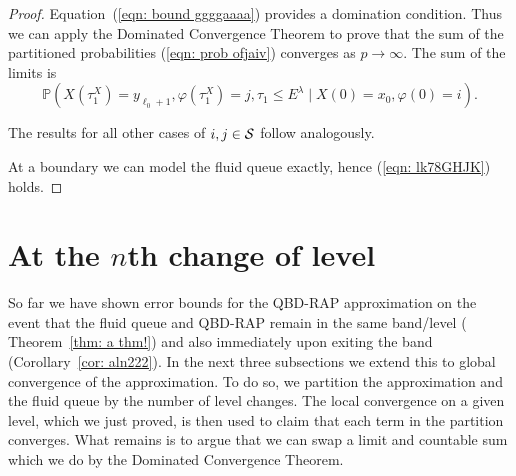 \begin{proof}
	
	Equation~(\ref{eqn: bound ggggaaaa}) provides a domination condition. Thus we can apply the Dominated Convergence Theorem to prove that the sum of the partitioned probabilities (\ref{eqn: prob ofjaiv}) converges as \(p\to\infty\). The sum of the limits is 
	\[\mathbb P(X(\tau_1^X) = y_{\ell_0+1}, \varphi(\tau_1^X) = j, \tau_{1}\leq E^\lambda 
            	 \mid X(0) = x_0, \varphi(0) = i).\]
	 
	 The results for all other cases of \(i,j\in\mathcal{S}\) follow analogously.
	
	At a boundary we can model the fluid queue exactly, hence (\ref{eqn: lk78GHJK}) holds.
\end{proof}


\section{At the \(n\)th change of level}\label{sec: nth change}

So far we have shown error bounds for the QBD-RAP approximation on the event that the fluid queue and QBD-RAP remain in the same band/level (%
Theorem~\ref{thm: a thm!}) and also immediately upon exiting the band (Corollary~\ref{cor: aln222}). In the next three subsections we extend this to global convergence of the approximation. To do so, we partition the approximation and the fluid queue by the number of level changes. The local convergence on a given level, which we just proved, is then used to claim that each term in the partition converges. What remains is to argue that we can swap a limit and countable sum which we do by the Dominated Convergence Theorem. 

